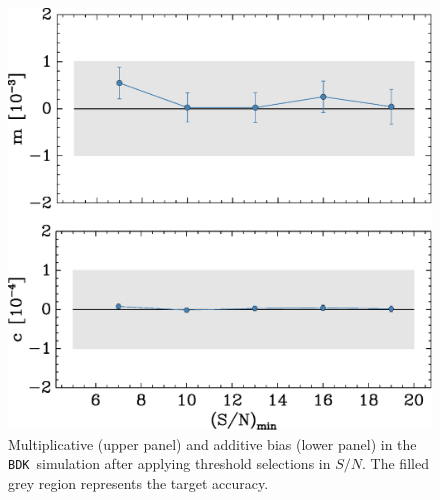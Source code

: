 \documentclass[iop]{emulateapj}
\newcommand{\snr}{$S/N$}
\newcommand{\bdsim}{\texttt{BDK}}
\begin{document}
\begin{figure}
    \centering
    \includegraphics[width=\columnwidth]{mc-select-bias-thresh.eps}

    \caption{Multiplicative (upper panel) and
		additive bias (lower panel) in the \bdsim\ simulation after applying
        threshold selections in \snr.   
        The filled grey region represents the target accuracy. } 

\label{fig:s2nthresh}
\end{figure}
\end{document}
